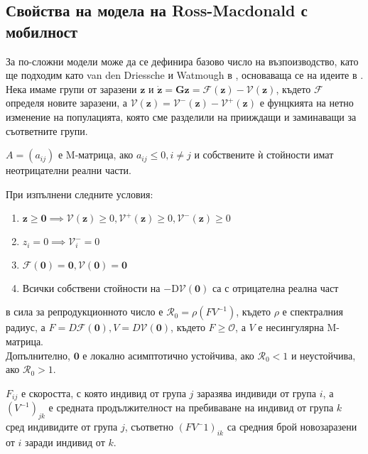 \subsection{Свойства на модела на Ross-Macdonald с мобилност}
За по-сложни модели може да се дефинира базово число на възпоизводство, като ще подходим като van den Driessche и Watmough в \cite{Driessche2002}, основаваща се на идеите в \cite{Diekmann1990}. Нека имаме групи от заразени $\mathbf{z}$ и $\dot{\mathbf{z}} = \mathbf{G}{\mathbf{z}} = \mathscr{F}(\mathbf{z}) - \mathscr{V}(\mathbf{z})$, където $\mathscr{F}$ определя новите заразени, а $\mathscr{V}(\mathbf{z}) = \mathscr{V}^-(\mathbf{z}) - \mathscr{V}^+(\mathbf{z})$ е фунцкията на нетно изменение на популацията, която сме разделили на прииждащи и заминаващи за съответните групи.

\begin{definition}[M-матрица]
  $A = (a_{ij})$ е M-матрица, ако $a_{ij} \leq 0, i \neq j$ и собствените ѝ стойности имат неотрицателни реални части.
\end{definition}

\begin{theorem}
  При изпълнени следните условия:
  \begin{enumerate}
    \item $\mathbf{z} \geq \mathbf{0} \implies \mathscr{V}(\mathbf{z}) \geq 0, \mathscr{V}^+(\mathbf{z}) \geq 0, \mathscr{V}^-(\mathbf{z}) \geq 0$
    \item $z_i = 0 \implies \mathscr{V}_{i}^- = 0$
    \item $\mathscr{F}(\mathbf{0}) = \mathbf{0}, \mathscr{V}(\mathbf{0}) = \mathbf{0}$
    \item Всички собствени стойности на $-\mathrm{D}\mathscr{V}{(\boldsymbol{0})}$ са с отрицателна реална част
    \end{enumerate}
  в сила за репродукционното число е $\mathscr{R}_0 = \rho(F V^{-1})$, където $\rho$ е спектралния радиус, а $F = D\mathscr{F}(\mathbf{0}), V = D\mathscr{V}(\mathbf{0})$, където $F \geq \mathscr{O}$, а $V$ е несингулярна M-матрица. \\
  Допълнително, $\mathbf{0}$ е локално асимптотично устойчива, ако $\mathscr{R}_0 < 1$ и неустойчива, ако $\mathscr{R}_0 > 1$.
\end{theorem}

$F_{ij}$ е скоростта, с която индивид от група $j$ заразява индивиди от група $i$, а $(V^{-1})_{jk}$ е средната продължителност на пребиваване на индивид от група $k$ сред индивидите от група $j$, съответно $(F V^-1)_{ik}$ са средния брой новозаразени от $i$ заради индивид от $k$.

